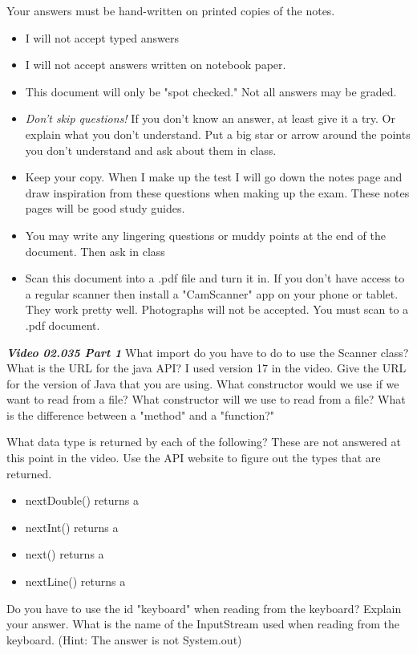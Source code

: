 \documentclass[letterpaper,11pt]{exam}
\newcommand{\videoheading}[1]{\Large\textbf{\textit{#1}}}
\begin{document}
Your answers must be hand-written on printed copies of the notes.  
\begin{itemize}
    \item I will not accept typed answers
    \item I will not accept answers written on notebook paper.
    \item This document will only be "spot checked."  Not all answers may be graded.
    \item \textit{Don't skip questions!} If you don't know an answer, at least give it a try.  Or explain what you don't understand.  Put a big star or arrow around the points you don't understand and ask about them in class.
    \item Keep your copy.  When I make up the test I will go down the notes page and draw inspiration from these questions when making up the exam. These notes pages will be good study guides.
    \item You may write any lingering questions or muddy points at the end of the document.  Then ask in class
    \item Scan this document into a .pdf file and turn it in.  If you don't have access to a regular scanner then install a "CamScanner" app on your phone or tablet.  They work pretty well.  Photographs will not be accepted.  You must scan to a .pdf document.
\end{itemize}
\videoheading{Video 02.035 Part 1}
\question 
\question What import do you have to do to use the Scanner class?
\question What is the URL for the java API?  I used version 17 in the video.  Give the URL for the version of Java that you are using.
\question What constructor would we use if we want to read from a file?
\question What constructor will we use to read from a file?
\question What is the difference between a "method" and a "function?"
\begin{samepage}
\question What data type is returned by each of the following?  These are not answered at this point in the video.  Use the API website to figure out the types that are returned.
\begin{itemize}
  \item nextDouble() returns a \makebox[2in]{\hrulefill}
  \item nextInt() returns a \makebox[2in]{\hrulefill}
  \item next() returns a \makebox[2in]{\hrulefill}
  \item nextLine() returns a \makebox[2in]{\hrulefill}
\end{itemize}
\end{samepage}
\question Do you have to use the id "keyboard" when reading from the keyboard?  Explain your answer.
\vspace{1cm}
\question What is the name of the InputStream used when reading from the keyboard.  (Hint:  The answer is not System.out)
\end{document}
